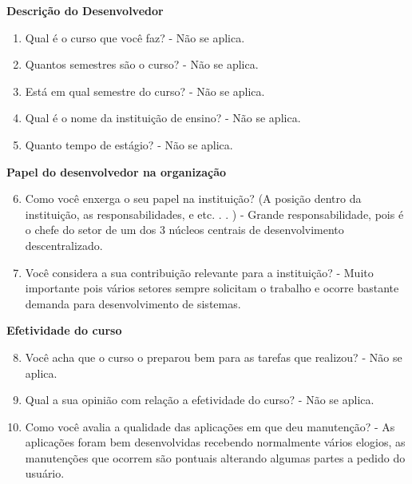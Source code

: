 \begin{apendicesenv}
\textbf{Descrição do Desenvolvedor}

\begin{enumerate}
	\item Qual é o curso que você faz?\newline
	- Não se aplica.
	\item Quantos semestres são o curso?\newline
	- Não se aplica.
	\item Está em qual semestre do curso?\newline
	- Não se aplica.
	\item Qual é o nome da instituição de ensino?\newline
	- Não se aplica.
	\item Quanto tempo de estágio?\newline
	- Não se aplica.
\end{enumerate}

\textbf{Papel do desenvolvedor na organização}

\begin{enumerate}
	\setcounter{enumi}{5}
	\item Como você enxerga o seu papel na instituição? (A posição dentro da instituição, as
	responsabilidades, e etc. . . )\newline
	-  Grande responsabilidade, pois é o chefe do setor de um dos 3 núcleos centrais de desenvolvimento descentralizado.
	\item Você considera a sua contribuição relevante para a instituição?\newline
	- Muito importante pois vários setores sempre solicitam o trabalho e ocorre bastante demanda para desenvolvimento de sistemas.
\end{enumerate}

\textbf{Efetividade do curso}

\begin{enumerate}
	\setcounter{enumi}{7}
	\item Você acha que o curso o preparou bem para as tarefas que realizou?\newline
	- Não se aplica.
	\item Qual a sua opinião com relação a efetividade do curso?\newline
	- Não se aplica.
	\item Como você avalia a qualidade das aplicações em que deu manutenção?\newline
	- As aplicações foram bem desenvolvidas recebendo normalmente vários elogios, as manutenções que ocorrem são pontuais alterando algumas partes a pedido do usuário.
\end{enumerate}


\end{apendicesenv}
